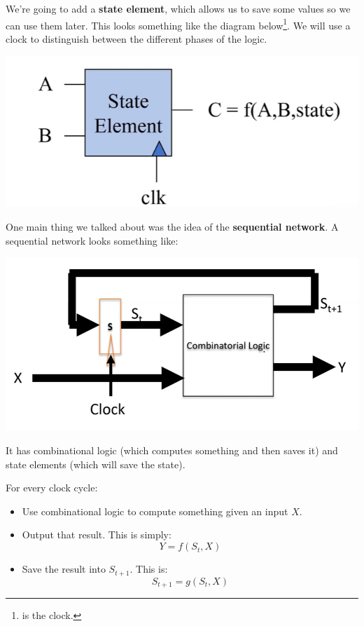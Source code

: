 \documentclass[letterpaper]{article}
\begin{document}
\bigskip 

We're going to add a \textbf{state element}, which allows us to save some values so we can use them later. This looks something like the diagram below\footnote{ is the clock.}. We will use a clock to distinguish between the different phases of the logic. 
\begin{center}
    \includegraphics[scale=0.5]{img/state_element.PNG}
\end{center}
One main thing we talked about was the idea of the \textbf{sequential network}. A sequential network looks something like: 
\begin{center}
    \includegraphics[scale=0.3]{img/sequential_network.PNG}
\end{center}

It has combinational logic (which computes something and then saves it) and state elements (which will save the state).

\bigskip 

For every clock cycle:
\begin{itemize}
    \item Use combinational logic to compute something given an input $X$. 
    \item Output that result. This is simply:
    \[Y = f(S_t, X)\]
    \item Save the result into $S_{t + 1}$. This is:
    \[S_{t + 1} = g(S_t, X)\]
\end{itemize}
\end{document}
